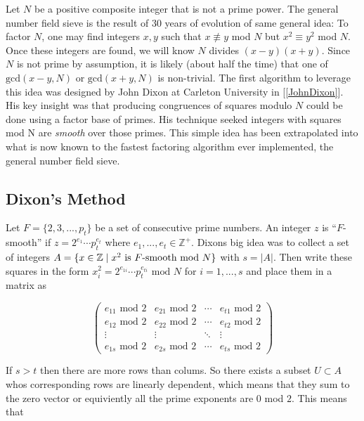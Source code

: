 

Let $N$ be a positive composite integer that is not a prime power. The general number field sieve is the result of 30 years of evolution of same general idea: To factor $N$, one may find integers $x,y$ such that $x \not\equiv y$ mod $N$ but $x^2 \equiv y^ 2$ mod $N$. Once these integers are found, we will know $N$ divides $(x - y)(x+y)$. Since $N$ is not prime by assumption, it is likely (about half the time) that one of $\text{gcd}(x-y,N)$ or  $\text{gcd}(x+y,N)$ is non-trivial. The first algorithm to leverage this idea was designed by John Dixon at Carleton University in [\ref{JohnDixon}]. His key insight was that producing congruences of squares modulo $N$ could be done using a factor base of primes. His technique seeked integers with squares mod N are \textit{smooth} over those primes. This simple idea has been extrapolated into what is now known to the fastest factoring algorithm ever implemented, the general number field sieve. 


\subsection{Dixon's Method}
  Let $F = \lbrace 2,3,...,p_t \rbrace$ be a set of consecutive prime numbers. An integer $z$ is “$F$-smooth” if $z = 2^{e_1} \cdots p_t^{e_t} $ where $e_1,...,e_t \in \mathbb{Z}^+$. Dixons big idea was to collect a set of integers $A = \lbrace x \in \mathbb{Z} \mid x^2 \text{ is }F\text{-smooth mod } N \rbrace $ with $s = | A | $. Then write these squares in the form $x_i^2 = 2^{e_{1i}}  \cdots p_{t}^{e_{ti}} \text{ mod } N$ for $i = 1,...,s$ and place them in a matrix as 

  $$
  \begin{pmatrix}
    e_{11} \text{ mod } 2 & e_{21} \text{ mod } 2 & \cdots & e_{t1} \text{ mod } 2 \\
    e_{12} \text{ mod } 2 & e_{22} \text{ mod } 2 & \cdots & e_{t2} \text{ mod } 2 \\
    \vdots  & \vdots  & \ddots & \vdots  \\
    e_{1s} \text{ mod } 2 & e_{2s} \text{ mod } 2 & \cdots & e_{ts} \text{ mod } 2 
   \end{pmatrix}
  $$

  If $s>t$ then there are more rows than colums. So there exists a subset $U \subset A$ whos corresponding rows are linearly dependent, which means that they sum to the zero vector or equiviently all the prime exponents are $0$ mod $2$. This means that 

